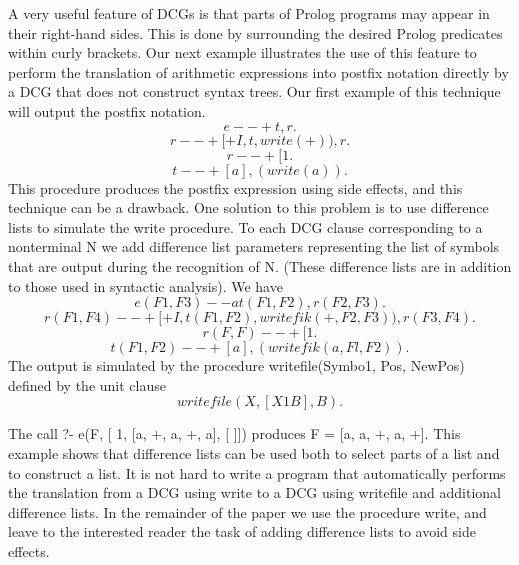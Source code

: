 A very useful feature of DCGs is that parts of Prolog programs may appear in
their right-hand sides. This is done by surrounding the desired Prolog predicates
within curly brackets. Our next example illustrates the use of this feature to
perform the translation of arithmetic expressions into postfix notation directly
by a DCG that does not construct syntax trees. Our first example of this technique
will output the postfix notation.
\[e --+ t, r.\]
\[r --+ [+I, t, write(+)), r.\]
\[r --+ [ 1.\]
\[t --+ [a], (write(a)).\]
This procedure produces the postfix expression using side effects, and this
technique can be a drawback. One solution to this problem is to use difference 
lists to simulate the write procedure. To each DCG clause corresponding to a
nonterminal N we add difference list parameters representing the list of symbols
that are output during the recognition of N. (These difference lists are in addition
to those used in syntactic analysis). We have
\[e(F1, F3) --a t(F1, F2), r(F2, F3).\]
\[r(F1, F4) --+ [+I, t(F1, F2), writefik(+, F2, F3)), r(F3, F4).\]
\[r(F, F) --+ [ 1.\]
\[t(F1, F2) --+ [a], (writefik(a, Fl, F2)).\]
The output is simulated by the procedure writefile(Symbo1, Pos, NewPos) defined
by the unit clause
\[writefile(X, [X 1 B], B).\]

The call ?- e(F, [ 1, [a, +, a, +, a], [ ]]) produces F = [a, a, +, a, +]. This
example shows that difference lists can be used both to select parts of a list and to
construct a list. It is not hard to write a program that automatically performs
the translation from a DCG using write to a DCG using writefile and additional
difference lists. In the remainder of the paper we use the procedure write, and
leave to the interested reader the task of adding difference lists to avoid side
effects. 

